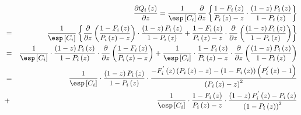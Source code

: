 \begin{eqnarray*}
&&\frac{\partial Q_{i}\left(z\right)}{\partial z}=\frac{1}{\esp\left[C_{i}\right]}\frac{\partial}{\partial z}\left\{\frac{1-F_{i}\left(z\right)}{P_{i}\left(z\right)-z}\cdot\frac{\left(1-z\right)P_{i}\left(z\right)}{1-P_{i}\left(z\right)}\right\}\\
&=&\frac{1}{\esp\left[C_{i}\right]}\left\{\frac{\partial}{\partial z}\left(\frac{1-F_{i}\left(z\right)}{P_{i}\left(z\right)-z}\right)\cdot\frac{\left(1-z\right)P_{i}\left(z\right)}{1-P_{i}\left(z\right)}+\frac{1-F_{i}\left(z\right)}{P_{i}\left(z\right)-z}\cdot\frac{\partial}{\partial z}\left(\frac{\left(1-z\right)P_{i}\left(z\right)}{1-P_{i}\left(z\right)}\right)\right\}\\
&=&\frac{1}{\esp\left[C_{i}\right]}\cdot\frac{\left(1-z\right)P_{i}\left(z\right)}{1-P_{i}\left(z\right)}\cdot\frac{\partial}{\partial z}\left(\frac{1-F_{i}\left(z\right)}{P_{i}\left(z\right)-z}\right)+\frac{1}{\esp\left[C_{i}\right]}\cdot\frac{1-F_{i}\left(z\right)}{P_{i}\left(z\right)-z}\cdot\frac{\partial}{\partial z}\left(\frac{\left(1-z\right)P_{i}\left(z\right)}{1-P_{i}\left(z\right)}\right)\\
&=&\frac{1}{\esp\left[C_{i}\right]}\cdot\frac{\left(1-z\right)P_{i}\left(z\right)}{1-P_{i}\left(z\right)}\cdot\frac{-F_{i}^{'}\left(z\right)\left(P_{i}\left(z\right)-z\right)-\left(1-F_{i}\left(z\right)\right)\left(P_{i}^{'}\left(z\right)-1\right)}{\left(P_{i}\left(z\right)-z\right)^{2}}\\
&+&\frac{1}{\esp\left[C_{i}\right]}\cdot\frac{1-F_{i}\left(z\right)}{P_{i}\left(z\right)-z}\cdot\frac{\left(1-z\right)P_{i}^{'}\left(z\right)-P_{i}\left(z\right)}{\left(1-P_{i}\left(z\right)\right)^{2}}
\end{eqnarray*}




